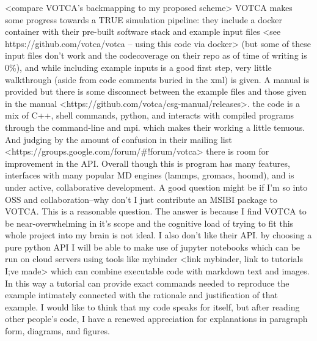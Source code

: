 <compare VOTCA's backmapping to my proposed scheme>
VOTCA makes some progress towards a TRUE simulation pipeline: they include a docker container with their pre-built software stack and example input files <see https://github.com/votca/votca -- using this code via docker> (but some of these input files don't work and the codecoverage on their repo as of time of writing is 0\%), and while including example inputs is a good first step, very little walkthrough (aside from code comments buried in the xml) is given. A manual is provided but there is some disconnect between the example files and those given in the manual <https://github.com/votca/csg-manual/releases>. the code is a mix of C++, shell commands, python, and interacts with compiled programs through the command-line and mpi. which makes their working a little tenuous. And judging by the amount of confusion in their mailing list <https://groups.google.com/forum/#!forum/votca> there is room for improvement in the API. Overall though this is program has many features, interfaces with many popular MD engines (lammps, gromacs, hoomd), and is under active, collaborative development.
A good question might be if I'm so into OSS and collaboration--why don't I just contribute an MSIBI package to VOTCA. This is a reasonable question. The answer is because I find VOTCA to be near-overwhelming in it's scope and the cognitive load of trying to fit this whole project into my brain is not ideal. I also don't like their API. by choosing a pure python API I will be able to make use of jupyter notebooks which can be run on cloud servers using tools like mybinder <link mybinder, link to tutorials I;ve made> which can combine executable code with markdown text and images. In this way a tutorial can provide exact commands needed to reproduce the example intimately connected with the rationale and justification of that example. I would like to think that my code speaks for itself, but after reading other people's code, I have a renewed appreciation for explanations in paragraph form, diagrams, and figures.

